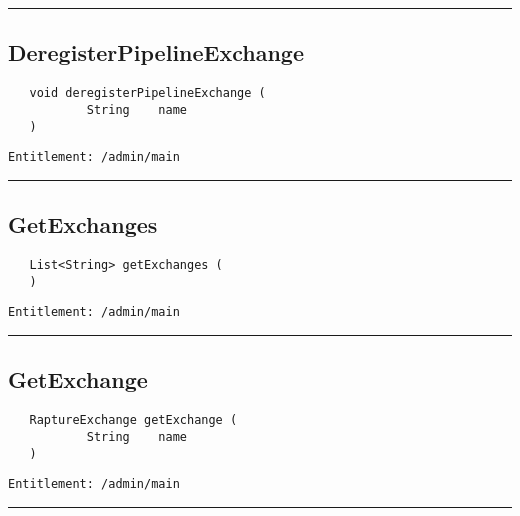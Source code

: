 \rule{12cm}{2pt}
\subsection{DeregisterPipelineExchange}
\label{Api:DeregisterPipelineExchange}
\begin{Verbatim}
   void deregisterPipelineExchange (
           String    name
   )
\end{Verbatim}
\begin{Verbatim}[formatcom=\color{Maroon}]
  Entitlement: /admin/main
\end{Verbatim}



\rule{12cm}{2pt}
\subsection{GetExchanges}
\label{Api:GetExchanges}
\begin{Verbatim}
   List<String> getExchanges (
   )
\end{Verbatim}
\begin{Verbatim}[formatcom=\color{Maroon}]
  Entitlement: /admin/main
\end{Verbatim}



\rule{12cm}{2pt}
\subsection{GetExchange}
\label{Api:GetExchange}
\begin{Verbatim}
   RaptureExchange getExchange (
           String    name
   )
\end{Verbatim}
\begin{Verbatim}[formatcom=\color{Maroon}]
  Entitlement: /admin/main
\end{Verbatim}



\rule{12cm}{2pt}
